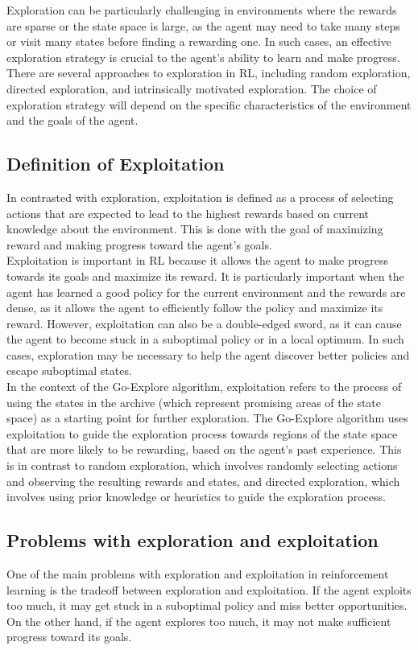 \documentclass[runningheads]{llncs}%
\begin{document}
Exploration can be particularly challenging in environments where the rewards are sparse or the state space is large, as the agent may need to take many steps or visit many states before finding a rewarding one. In such cases, an effective exploration strategy is crucial to the agent's ability to learn and make progress. There are several approaches to exploration in RL, including random exploration, directed exploration, and intrinsically motivated exploration. The choice of exploration strategy will depend on the specific characteristics of the environment and the goals of the agent.

\subsection{Definition of Exploitation}
In contrasted with exploration, exploitation is defined as a process of selecting actions that are expected to lead to the highest rewards based on current knowledge about the environment. This is done with the goal of maximizing reward and making progress toward the agent's goals.\\

Exploitation is important in RL because it allows the agent to make progress towards its goals and maximize its reward. It is particularly important when the agent has learned a good policy for the current environment and the rewards are dense, as it allows the agent to efficiently follow the policy and maximize its reward. However, exploitation can also be a double-edged sword, as it can cause the agent to become stuck in a suboptimal policy or in a local optimum. In such cases, exploration may be necessary to help the agent discover better policies and escape suboptimal states.\\

In the context of the Go-Explore algorithm, exploitation refers to the process of using the states in the archive (which represent promising areas of the state space) as a starting point for further exploration. The Go-Explore algorithm uses exploitation to guide the exploration process towards regions of the state space that are more likely to be rewarding, based on the agent's past experience. This is in contrast to random exploration, which involves randomly selecting actions and observing the resulting rewards and states, and directed exploration, which involves using prior knowledge or heuristics to guide the exploration process.

\subsection{Problems with exploration and exploitation}
One of the main problems with exploration and exploitation in reinforcement learning is the tradeoff between exploration and exploitation. If the agent exploits too much, it may get stuck in a suboptimal policy and miss better opportunities. On the other hand, if the agent explores too much, it may not make sufficient progress toward its goals.\\
\end{document}
